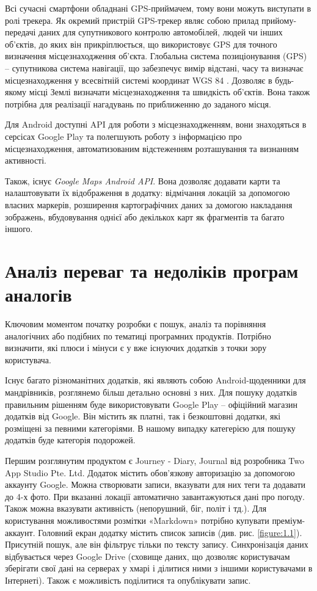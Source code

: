 \documentclass[../main.tex]{subfiles}
\begin{document}
Всі сучасні смартфони обладнані GPS-приймачем, тому вони можуть виступати в ролі трекера.  Як окремий пристрій GPS-трекер являє собою прилад прийому-передачі даних для супутникового контролю автомобілей, людей чи інших об'єктів, до яких він прикріплюється, що використовує GPS для точного визначення місцезнаходження об'єкта. Глобальна система позиціонування (GPS) – супутникова система навігації, що забезпечує вимір відстані, часу та визначає місцезнаходження у всесвітній системі координат WGS 84 \cite{gps}. Дозволяє в будь-якому місці Землі визначати місцезнаходження та швидкість об'єктів. Вона також потрібна для реалізації нагадувань по приближенню до заданого місця.

Для Android доступні API для роботи з місцезнаходженням, вони знаходяться в серсісах Google Play та полегшують роботу з інформацією про місцезнаходження, автоматизованим відстеженням розташування та визнанням активності. 

Також, існує \textit{Google Maps Android API}. Вона дозволяє додавати карти та налаштовувати їх відображення в додатку: відмічання локацій за допомогою власних маркерів, розширення картографічних даних за домогою накладання зображень, вбудовування однієї або декількох карт як фрагментів та багато іншого.

\section{Аналіз переваг та недоліків програм аналогів}

Ключовим моментом початку розробки є пошук, аналіз та порівняння аналогічних або подібних по тематиці програмних продуктів. Потрібно визначити, які плюси і мінуси є у вже існуючих додатків з точки зору користувача.

Існує багато різноманітних додатків, які являють собою Android-щоденники для мандрівників, розглянемо більш детально основні з них. Для пошуку додатків правильним рішенням буде використовувати Google Play -- офіційний магазин додатків від Google. Він містить як платні, так і безкоштовні додатки, які розміщені за певними категоріями. В нашому випадку категерією для пошуку додатків буде категорія подорожей.

Першим розглянутим продуктом є Journey - Diary, Journal від розробника Two App Studio Pte. Ltd. Додаток містить обов'язкову авторизацію за допомогою аккаунту Google. Можна створювати записи, вказувати для них теги та додавати до 4-х фото. При вказанні локації автоматично завантажуються дані про погоду. Також можна вказувати активність (непорушний, біг, політ і тд.). Для користування можливостями розмітки «Markdown» потрібно купувати преміум-аккаунт. Головний екран додатку містить список записів (див. рис. \ref{figure:1.1}). Присутній пошук, але він фільтрує тільки по тексту запису. Синхронізація даних відбувається через Google Drive (сховище даних, що дозволяє користувачам зберігати свої дані на серверах у хмарі і ділитися ними з іншими користувачами в Інтернеті). Також є можливість поділитися та опублікувати запис. 
\end{document}
